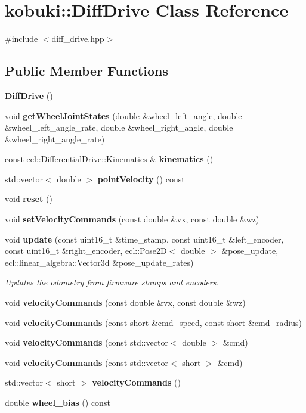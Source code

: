 \section{kobuki\-:\-:\-Diff\-Drive \-Class \-Reference}
\label{classkobuki_1_1DiffDrive}


{\ttfamily \#include $<$diff\-\_\-drive.\-hpp$>$}

\subsection*{\-Public \-Member \-Functions}
\begin{DoxyCompactItemize}
\item 
{\bf \-Diff\-Drive} ()
\item 
void {\bf get\-Wheel\-Joint\-States} (double \&wheel\-\_\-left\-\_\-angle, double \&wheel\-\_\-left\-\_\-angle\-\_\-rate, double \&wheel\-\_\-right\-\_\-angle, double \&wheel\-\_\-right\-\_\-angle\-\_\-rate)
\item 
const \*
ecl\-::\-Differential\-Drive\-::\-Kinematics \& {\bf kinematics} ()
\item 
std\-::vector$<$ double $>$ {\bf point\-Velocity} () const 
\item 
void {\bf reset} ()
\item 
void {\bf set\-Velocity\-Commands} (const double \&vx, const double \&wz)
\item 
void {\bf update} (const uint16\-\_\-t \&time\-\_\-stamp, const uint16\-\_\-t \&left\-\_\-encoder, const uint16\-\_\-t \&right\-\_\-encoder, ecl\-::\-Pose2\-D$<$ double $>$ \&pose\-\_\-update, ecl\-::linear\-\_\-algebra\-::\-Vector3d \&pose\-\_\-update\-\_\-rates)
\begin{DoxyCompactList}\small\item\em \-Updates the odometry from firmware stamps and encoders. \end{DoxyCompactList}\item 
void {\bf velocity\-Commands} (const double \&vx, const double \&wz)
\item 
void {\bf velocity\-Commands} (const short \&cmd\-\_\-speed, const short \&cmd\-\_\-radius)
\item 
void {\bf velocity\-Commands} (const std\-::vector$<$ double $>$ \&cmd)
\item 
void {\bf velocity\-Commands} (const std\-::vector$<$ short $>$ \&cmd)
\item 
std\-::vector$<$ short $>$ {\bf velocity\-Commands} ()
\item 
double {\bf wheel\-\_\-bias} () const 
\end{DoxyCompactItemize}
